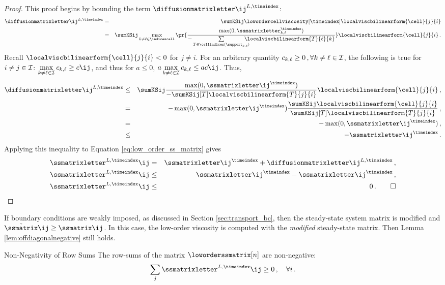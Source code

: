 \begin{prf}
\begin{proof}
This proof begins by bounding the term $\diffusionmatrixletter\ij^{L,\timeindex}$:
\begin{eqnarray*}
   \diffusionmatrixletter\ij^{L,\timeindex}
   & = &
     \sumKSij\lowordercellviscosity[\timeindex]
   \localviscbilinearform{\cell}{j}{i}\\
   & = & \sumKSij\max\limits_{k\ne \ell\in \indicescell}
     \pr{\frac{\max(0,\ssmatrixletter_{k,\ell}^\timeindex)}
       {-\sum\limits_{T\in\cellindices(\support_{k,\ell})}
       \mkern-20mu\localviscbilinearform{T}{\ell}{k}}}
     \localviscbilinearform{\cell}{j}{i} \eqp
\end{eqnarray*}
Recall $\localviscbilinearform{\cell}{j}{i} < 0$ for $j\ne i$.
For an arbitrary quantity $c_{k,\ell} \geq 0 \,, \forall k\ne\ell\in\mathcal{I}$,
the following is true for $i\ne j\in\mathcal{I}$:
$\max\limits_{k\ne\ell\in\indices}c_{k,\ell} \geq c\ij$, and thus for $a\leq 0$,
$a\max\limits_{k\ne\ell\in\indices}c_{k,\ell} \leq a c\ij$.
Thus,
\begin{eqnarray*}
   \diffusionmatrixletter\ij^{L,\timeindex} & \le &
     \sumKSij \frac{\max(0,\ssmatrixletter\ij^\timeindex)}
   {-\sumKSij[T]\localviscbilinearform{T}{j}{i}}
   \localviscbilinearform{\cell}{j}{i} \eqc\\
   &  =  & -\max(0,\ssmatrixletter\ij^\timeindex)
     \frac{\sumKSij\localviscbilinearform{\cell}{j}{i}}
     {\sumKSij[T]\localviscbilinearform{T}{j}{i}} \eqc\\
   &  =  & -\max(0,\ssmatrixletter\ij^\timeindex) \eqc\\
   & \le & -\ssmatrixletter\ij^\timeindex \eqp
\end{eqnarray*}
Applying this inequality to Equation \eqref{eq:low_order_ss_matrix} gives
\begin{eqnarray*}
  \ssmatrixletter^{L,\timeindex}\ij &  =  &
    \ssmatrixletter\ij^\timeindex + \diffusionmatrixletter\ij^{L,\timeindex}
    \eqc\\
  \ssmatrixletter^{L,\timeindex}\ij & \le &
    \ssmatrixletter\ij^\timeindex - \ssmatrixletter\ij^\timeindex
    \eqc\\
  \ssmatrixletter^{L,\timeindex}\ij & \le & 0 \eqp \qed
\end{eqnarray*}
\end{proof}
\begin{remark}
If boundary conditions are weakly imposed, as discussed in Section
\ref{sec:transport_bc}, then the steady-state system matrix is modified
and $\tilde{\ssmatrix}\ij \geq \ssmatrix\ij$. In this case, the low-order
viscosity is computed with the \emph{modified} steady-state matrix. Then
Lemma \ref{lem:offdiagonalnegative} still holds.
\end{remark}
\begin{lemma}{Non-Negativity of Row Sums}
   The row-sums of the matrix $\loworderssmatrix[n]$ are non-negative:
   \[
     \sumj \ssmatrixletter^{L,\timeindex}\ij \ge 0
       \eqc \quad \forall i \eqp
   \]
\end{lemma}


\end{prf}
